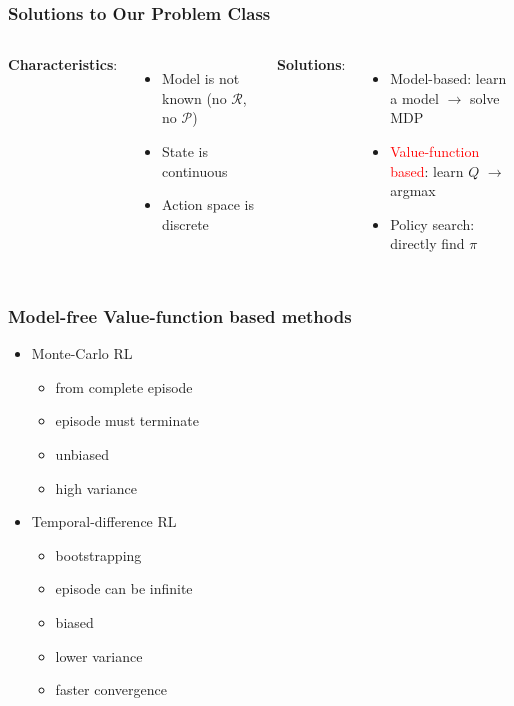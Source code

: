 \documentclass{beamer}
\begin{document}
\begin{frame}
\frametitle{Solutions to Our Problem Class}
\begin{columns}[c] %
	
	\textbf{Characteristics}:
	\begin{itemize}
		\item Model is not known (no $\mathcal{R}$, no $\mathcal{P}$)
		\item State is continuous  
		\item Action space is discrete 
	
	\end{itemize} 
	
		\textbf{Solutions}:
	\begin{itemize}
	\item Model-based: learn a model $\rightarrow$ solve MDP
	\item \textcolor{red}{Value-function based}: learn $Q$ $\rightarrow$ argmax
	\item Policy search: directly find $\pi$

	\end{itemize}
	
\end{columns}

\end{frame}


\begin{frame}
\frametitle{Model-free Value-function based methods}

\begin{itemize}
	\item Monte-Carlo RL
		\begin{itemize}
			\item from complete episode 
			\item episode must terminate
			\item unbiased
			\item high variance
		\end{itemize}
	
	\item Temporal-difference RL
		\begin{itemize}
			\item bootstrapping
			\item episode can be infinite
			\item biased
			\item lower variance
			\item faster convergence
		\end{itemize}
		
\end{itemize}
\end{frame}
\end{document}
